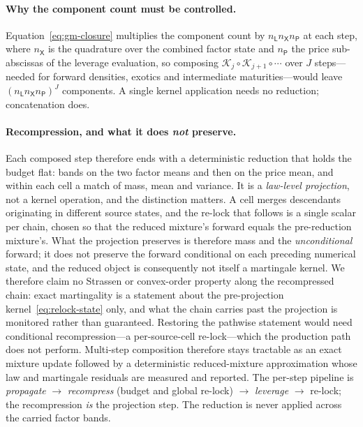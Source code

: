 \documentclass[11pt]{article}
\newcommand{\cK}{\mathcal{K}}
\providecommand{\1}{\mathbf 1}
\begin{document}
\paragraph{Why the component count must be controlled.} Equation~\eqref{eq:gm-closure} multiplies
the component count by $n_{\mathsf L}n_{\mathsf X}n_{\mathsf P}$ at each step, where
$n_{\mathsf X}$ is the quadrature over the combined factor state and $n_{\mathsf P}$ the price
sub-abscissas of the leverage evaluation, so composing
$\cK_j\circ\cK_{j+1}\circ\cdots$ over $J$ steps---needed for forward densities, exotics and
intermediate maturities---would leave $(n_{\mathsf L}n_{\mathsf X}n_{\mathsf P})^J$ components. A
single kernel application needs no reduction; concatenation does.

\paragraph{Recompression, and what it does \emph{not} preserve.} Each composed step therefore ends
with a deterministic reduction that holds the budget flat: bands on the two factor means and then on
the price mean, and within each cell a match of mass, mean and variance. It is a \emph{law-level
projection}, not a kernel operation, and the distinction matters. A cell merges descendants
originating in different source states, and the re-lock that follows is a single scalar per chain,
chosen so that the reduced mixture's forward equals the pre-reduction mixture's. What the projection
preserves is therefore mass and the \emph{unconditional} forward; it does not preserve the forward
conditional on each preceding numerical state, and the reduced object is consequently not itself a
martingale kernel. We therefore claim no Strassen or convex-order property along the recompressed
chain: exact martingality is a statement about the pre-projection kernel~\eqref{eq:relock-state}
only, and what the chain carries past the projection is monitored rather than guaranteed. Restoring
the pathwise statement would need conditional recompression---a per-source-cell re-lock---which the
production path does not perform. Multi-step composition therefore stays tractable as an exact
mixture update followed by a deterministic reduced-mixture approximation whose law and martingale
residuals are measured and reported. The per-step pipeline is \emph{propagate} $\to$
\emph{recompress} (budget and global re-lock) $\to$ \emph{leverage} $\to$ re-lock; the recompression
\emph{is} the projection step. The reduction is
never applied across the carried factor bands.
\end{document}
